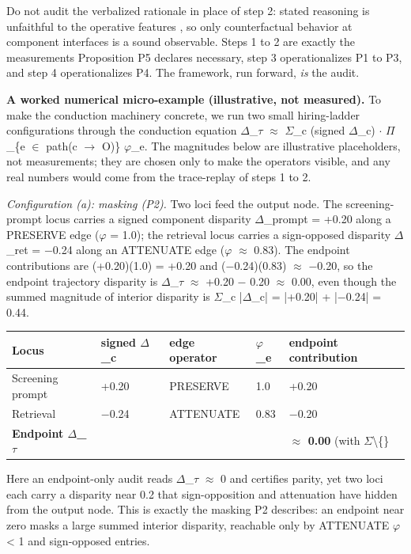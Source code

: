\documentclass[10pt]{article}
\begin{document}
Do not audit the verbalized rationale in place of step 2: stated reasoning is unfaithful to the operative features \cite{turpin2023language}, so only counterfactual behavior at component interfaces is a sound observable. Steps 1 to 2 are exactly the measurements Proposition P5 declares necessary, step 3 operationalizes P1 to P3, and step 4 operationalizes P4. The framework, run forward, \emph{is} the audit.

\textbf{A worked numerical micro-example (illustrative, not measured).} To make the conduction machinery concrete, we run two small hiring-ladder configurations through the conduction equation $\Delta$\_$\tau$ $\approx$ $\Sigma$\_c (signed $\Delta$\_c) $\cdot$ $\Pi$\_\{e $\in$ path(c $\rightarrow$ O)\} $\varphi$\_e. The magnitudes below are illustrative placeholders, not measurements; they are chosen only to make the operators visible, and any real numbers would come from the trace-replay of steps 1 to 2.

\emph{Configuration (a): masking (P2).} Two loci feed the output node. The screening-prompt locus carries a signed component disparity $\Delta$\_prompt = +0.20 along a PRESERVE edge ($\varphi$ = 1.0); the retrieval locus carries a sign-opposed disparity $\Delta$\_ret = $-$0.24 along an ATTENUATE edge ($\varphi$ $\approx$ 0.83). The endpoint contributions are (+0.20)(1.0) = +0.20 and ($-$0.24)(0.83) $\approx$ $-$0.20, so the endpoint trajectory disparity is $\Delta$\_$\tau$ $\approx$ +0.20 $-$ 0.20 $\approx$ 0.00, even though the summed magnitude of interior disparity is $\Sigma$\_c |$\Delta$\_c| = |+0.20| + |$-$0.24| = 0.44.

\begin{center}\footnotesize
\begin{longtable}{|p{}|p{}|p{}|p{}|p{}|}
\hline \textbf{Locus} & \textbf{signed $\Delta$\_c} & \textbf{edge operator} & \textbf{$\varphi$\_e} & \textbf{endpoint contribution} \\ \hline\endhead
Screening prompt & +0.20 & PRESERVE & 1.0 & +0.20 \\ \hline
Retrieval & $-$0.24 & ATTENUATE & 0.83 & $-$0.20 \\ \hline
\textbf{Endpoint $\Delta$\_$\tau$} &  &  &  & \textbf{$\approx$ 0.00} (with $\Sigma$\textbackslash\{\} \\ \hline
\end{longtable}\end{center}

Here an endpoint-only audit reads $\Delta$\_$\tau$ $\approx$ 0 and certifies parity, yet two loci each carry a disparity near 0.2 that sign-opposition and attenuation have hidden from the output node. This is exactly the masking P2 describes: an endpoint near zero masks a large summed interior disparity, reachable only by ATTENUATE $\varphi$ < 1 and sign-opposed entries.
\end{document}
